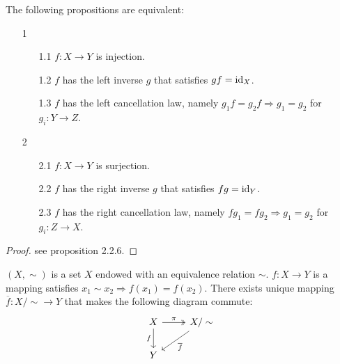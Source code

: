 \begin{proposition}
  The following propositions are equivalent:
  \begin{enumerate}
    \item[1]
    \begin{enumerate}
      \item[1.1] $f: X \to Y$ is injection.
      \item[1.2]  $f$ has the left inverse $g$ that satisfies $gf = \operatorname{id}_{X}$.
      \item[1.3] $f$ has the left cancellation law, namely $g_1 f = g_2 f \Rightarrow g_1 = g_2$ for $g_i: Y \to Z$.
    \end{enumerate}
    \item[2]
    \begin{enumerate}
      \item[2.1] $f: X \to Y$ is surjection.
      \item[2.2] $f$ has the right inverse $g$ that satisfies $fg = \operatorname{id}_{Y}$.
      \item[2.3] $f$ has the right cancellation law, namely $fg_1 = fg_2 \Rightarrow g_1 = g_2$ for $g_i: Z \to X$.  
    \end{enumerate}
  \end{enumerate}
\end{proposition}

\begin{proof}
  see \cite{LWW_AJN} proposition 2.2.6.
\end{proof}





\begin{theorem}
  \label{theorem equiv1}
  $(X, \sim)$ is a set $X$ endowed with an equivalence relation $\sim$. $f: X \to Y$ is a mapping satisfies $x_1 \sim x_2 \Rightarrow f(x_1) = f(x_2)$. There exists unique mapping $\overline{f}: X / \sim \to Y$ that makes the following diagram commute:
  \[
    \begin{tikzcd}
      X \arrow[two heads, r, "\pi"] \arrow[d, "f"'] 
      & X / \sim  \arrow[ld, "\overline{f}"]
      \\
      Y
    \end{tikzcd}
  \]
\end{theorem}




